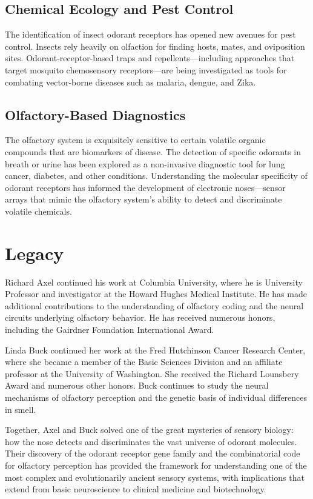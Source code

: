 \subsection{Chemical Ecology and Pest Control}

The identification of insect odorant receptors has opened new avenues for pest control. Insects rely heavily on olfaction for finding hosts, mates, and oviposition sites. Odorant-receptor-based traps and repellents---including approaches that target mosquito chemosensory receptors---are being investigated as tools for combating vector-borne diseases such as malaria, dengue, and Zika.

\subsection{Olfactory-Based Diagnostics}

The olfactory system is exquisitely sensitive to certain volatile organic compounds that are biomarkers of disease. The detection of specific odorants in breath or urine has been explored as a non-invasive diagnostic tool for lung cancer, diabetes, and other conditions. Understanding the molecular specificity of odorant receptors has informed the development of electronic noses---sensor arrays that mimic the olfactory system's ability to detect and discriminate volatile chemicals.

\section{Legacy}

Richard Axel continued his work at Columbia University, where he is University Professor and investigator at the Howard Hughes Medical Institute. He has made additional contributions to the understanding of olfactory coding and the neural circuits underlying olfactory behavior. He has received numerous honors, including the Gairdner Foundation International Award.

Linda Buck continued her work at the Fred Hutchinson Cancer Research Center, where she became a member of the Basic Sciences Division and an affiliate professor at the University of Washington. She received the Richard Lounsbery Award and numerous other honors. Buck continues to study the neural mechanisms of olfactory perception and the genetic basis of individual differences in smell.

Together, Axel and Buck solved one of the great mysteries of sensory biology: how the nose detects and discriminates the vast universe of odorant molecules. Their discovery of the odorant receptor gene family and the combinatorial code for olfactory perception has provided the framework for understanding one of the most complex and evolutionarily ancient sensory systems, with implications that extend from basic neuroscience to clinical medicine and biotechnology.


